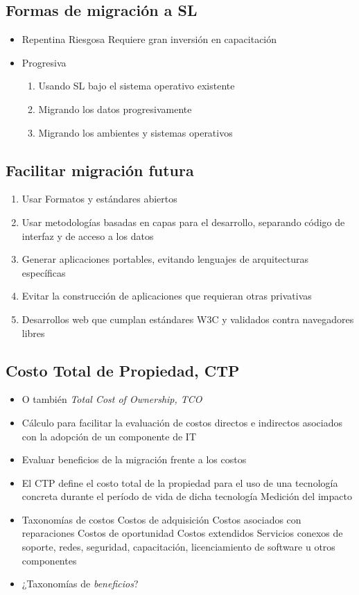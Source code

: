 \subsection {Formas de migración a SL}
\begin{itemize}
	\item Repentina
		\subitem Riesgosa
		\subitem Requiere gran inversión en capacitación
	\item Progresiva
	\begin{enumerate}
		\item Usando SL bajo el sistema operativo existente
		\item Migrando los datos progresivamente
		\item Migrando los ambientes y sistemas operativos	
	\end{enumerate}
\end{itemize}

\subsection {Facilitar migración futura}
\begin{enumerate}
	\item Usar Formatos y estándares abiertos
	\item Usar metodologías basadas en capas para el desarrollo, separando código de interfaz y de acceso a los datos 
	\item Generar aplicaciones portables, evitando lenguajes de arquitecturas específicas
	\item Evitar la construcción de aplicaciones que requieran otras privativas
	\item Desarrollos web que cumplan estándares W3C y validados contra navegadores libres
\end{enumerate}

\subsection {Costo Total de Propiedad, CTP}
\begin{itemize}
	\item O también \emph{Total Cost of Ownership, TCO}
	\item Cálculo para facilitar la evaluación de costos directos e indirectos asociados con la adopción de un componente de IT 
	\item Evaluar beneficios de la migración frente a los costos
	\item El CTP define el costo total de la propiedad para el uso de una tecnología concreta durante el período de vida de dicha tecnología
	\subitem Medición del impacto
	\item Taxonomías de costos
	\subitem Costos de adquisición
	\subitem Costos asociados con reparaciones
	\subitem Costos de oportunidad
	\subitem Costos extendidos
	\subsubitem Servicios conexos de soporte, redes, seguridad, capacitación, licenciamiento de software u otros componentes
	\item ¿Taxonomías de \emph{beneficios}?
\end{itemize}

